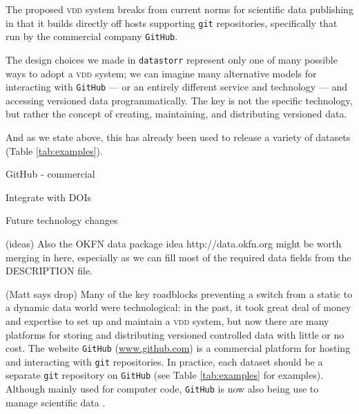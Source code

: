 \documentclass[a4paper,11pt]{article}
\newcommand{\smurl}[1]{{\footnotesize\href{https://#1}{#1}}}
\begin{document}
The proposed \textsc{vdd} system breaks from current norms for scientific data publishing in that it builds directly off hosts supporting \texttt{git} repositories, specifically that run by the commercial company \texttt{GitHub}.

The design choices we made in \texttt{datastorr} represent only one of many possible ways to adopt a \textsc{vdd} system; we can imagine many alternative models for interacting with \texttt{GitHub} --- or an entirely different service and technology --- and accessing versioned data programmatically. The key is not the specific technology, but rather the concept of creating, maintaining, and distributing versioned data.


And as we state above, this has already been used to release a variety of datasets (Table \ref{tab:examples}).

GitHub - commercial

Integrate with DOIs

Future technology changes

(ideas) Also the OKFN data package idea http://data.okfn.org might be worth merging in here, especially as we can fill most of the required data fields from the DESCRIPTION file.

(Matt says drop) Many of the key roadblocks preventing a switch from a static to a dynamic data world were technological: in the past, it took great deal of money and expertise to set up and maintain a \textsc{vdd} system, but now there are many platforms for storing and distributing versioned controlled data with little or no cost. The website \texttt{GitHub} (\smurl{www.github.com}) is a commercial platform for hosting and interacting with \texttt{git} repositories. In practice, each dataset should be a separate \texttt{git} repository on \texttt{GitHub} (see Table \ref{tab:examples} for examples). Although mainly used for computer code, \texttt{GitHub} is now also being use to manage scientific data \citep{Perkel-2016}.
\end{document}
